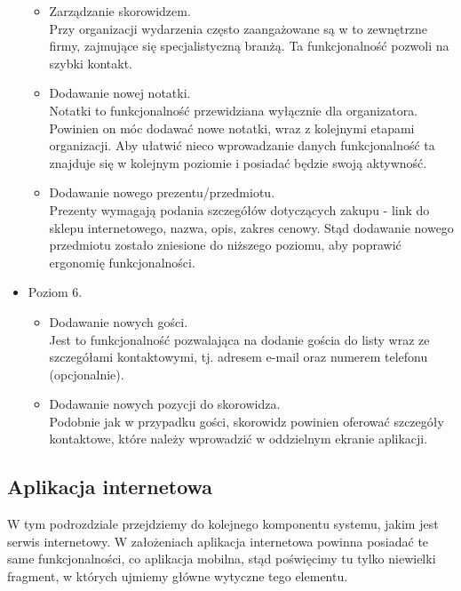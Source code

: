 \documentclass[10pt,titlepage]{article}
\begin{document}
\begin{itemize}
\begin{itemize}
	\item Zarządzanie skorowidzem.
	\\Przy organizacji wydarzenia często zaangażowane są w to zewnętrzne firmy, zajmujące się specjalistyczną branżą. Ta funkcjonalność pozwoli na szybki kontakt.
	\item Dodawanie nowej notatki.
	\\Notatki to funkcjonalność przewidziana wyłącznie dla organizatora. Powinien on móc dodawać nowe notatki, wraz z kolejnymi etapami organizacji. Aby ułatwić nieco wprowadzanie danych
	funkcjonalność ta znajduje się w kolejnym poziomie i posiadać będzie swoją aktywność.
	\item Dodawanie nowego prezentu/przedmiotu.
	\\Prezenty wymagają podania szczegółów dotyczących zakupu - link do sklepu internetowego, nazwa, opis, zakres cenowy. Stąd dodawanie nowego przedmiotu zostało zniesione do niższego poziomu,
	aby poprawić ergonomię funkcjonalności.
      \end{itemize}
 \item Poziom 6.
      \begin{itemize}
       \item Dodawanie nowych gości.
       \\Jest to funkcjonalność pozwalająca na dodanie gościa do listy wraz ze szczegółami kontaktowymi, tj. adresem e-mail oraz numerem telefonu (opcjonalnie).
       \item Dodawanie nowych pozycji do skorowidza.
       \\Podobnie jak w przypadku gości, skorowidz powinien oferować szczegóły kontaktowe, które należy wprowadzić w oddzielnym ekranie aplikacji.
      \end{itemize}
      
\end{itemize}

\subsection{Aplikacja internetowa}
W tym podrozdziale przejdziemy do kolejnego komponentu systemu, jakim jest serwis internetowy.
W założeniach aplikacja internetowa powinna posiadać te same funkcjonalności, co aplikacja mobilna, stąd poświęcimy tu tylko niewielki fragment, w których ujmiemy główne wytyczne tego elementu. 
\end{document}
